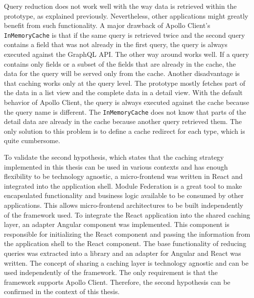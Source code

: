 \bigskip

\noindent Query reduction does not work well with the way data is retrieved within the prototype, as explained previously. Nevertheless, other applications might greatly benefit from such functionality. A major drawback of Apollo Client's \texttt{InMemoryCache} is that if the same query is retrieved twice and the second query contains a field that was not already in the first query, the query is always executed against the GraphQL \ac{API}. The other way around works well. If a query contains only fields or a subset of the fields that are already in the cache, the data for the query will be served only from the cache. Another disadvantage is that caching works only at the query level. The prototype mostly fetches part of the data in a list view and the complete data in a detail view. With the default behavior of Apollo Client, the query is always executed against the cache because the query name is different. The \texttt{InMemoryCache} does not know that parts of the detail data are already in the cache because another query retrieved them. The only solution to this problem is to define a cache redirect for each type, which is quite cumbersome.

\bigskip

\noindent To validate the second hypothesis, which states that the caching strategy implemented in this thesis can be used in various contexts and has enough flexibility to be technology agnostic, a micro-frontend was written in React and integrated into the application shell. Module Federation is a great tool to make encapsulated functionality and business logic available to be consumed by other applications. This allows micro-frontend architectures to be built independently of the framework used. To integrate the React application into the shared caching layer, an adapter Angular component was implemented. This component is responsible for initializing the React component and passing the information from the application shell to the React component. The base functionality of reducing queries was extracted into a library and an adapter for Angular and React was written. The concept of sharing a caching layer is technology agnostic and can be used independently of the framework. The only requirement is that the framework supports Apollo Client. Therefore, the second hypothesis can be confirmed in the context of this thesis.
